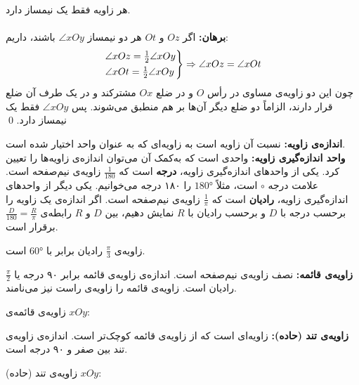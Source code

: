 \begin{theorem}
	هر زاویه فقط یک نیمساز دارد.
	\\ \dfth \\
	\textbf{برهان:}
	اگر $Oz$ و $Ot$ هر دو نیمساز
	$\angle xOy$
	باشند، داریم:
	\[
	\begin{rcases}
		\angle xOz = \frac{1}{2} \angle xOy \\
		\angle xOt = \frac{1}{2} \angle xOy
	\end{rcases}
	\Rightarrow \angle xOz = \angle xOt
	\]
چون این دو زاویه‌ی مساوی در رأس $O$ و در ضلع $Ox$ مشترکند و در یک طرف آن ضلع قرار دارند، الزاماً دو ضلع دیگر آن‌ها بر هم منطبق می‌شوند. پس
$\angle xOy$
فقط یک نیمساز دارد.
\qed
\end{theorem}
\smallskip
\textbf{اندازه‌ی زاویه:}
نسبت آن زاویه است به زاویه‌ای که به عنوان واحد اختیار شده است.
\\
\textbf{واحد اندازه‌گیری زاویه:}
واحدی است که به‌کمک آن می‌توان اندازه‌ی زاویه‌ها را تعیین کرد. یکی از واحدهای اندازه‌گیری زاویه،
\textbf{درجه}
است که
$\frac{1}{180}$
زاویه‌ی نیم‌صفحه است. علامت درجه
$\circ$
است، مثلاً
$\ang{180}$
را ۱۸۰ درجه می‌خوانیم.
یکی دیگر از واحدهای اندازه‌گیری زاویه،
\textbf{رادیان}
است که
$\frac{1}{\pi}$
زاویه‌ی نیم‌صفحه است. اگر اندازه‌ی یک زاویه را برحسب درجه با $D$ و برحسب رادیان با $R$ نمایش دهیم، بین $D$ و $R$ رابطه‌ی
$\frac{D}{180}=\frac{R}{\pi}$
برقرار است.
\begin{example}
	زاویه‌ی
	$\frac{\pi}{3}$
	رادیان برابر با
	$\ang{60}$
	است.
\end{example}
\smallskip
\textbf{زاویه‌ی قائمه:}
نصف زاویه‌ی نیم‌صفحه است. اندازه‌ی زاویه‌ی قائمه برابر ۹۰ درجه یا
$\frac{\pi}{2}$
رادیان است. زاویه‌ی قائمه را زاویه‌ی راست نیز می‌نامند.
\begin{example}
	زاویه‌ی قائمه‌ی $xOy$:
	\begin{center}
	\end{center}
\end{example}
\smallskip
\textbf{زاویه‌ی تند (حاده):}
زاویه‌ای است که از زاویه‌ی قائمه کوچک‌تر است. اندازه‌ی زاویه‌ی تند بین صفر و ۹۰ درجه است.
\begin{example}
	زاویه‌ی تند (حاده) $xOy$:
	\begin{center}
	\end{center}
\end{example}
